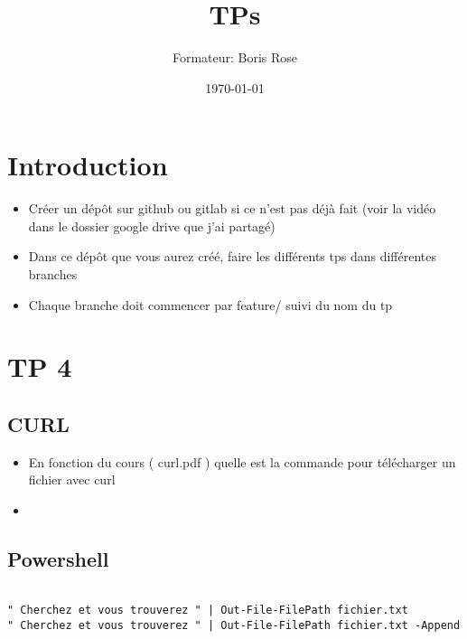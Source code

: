 \documentclass[12pt, letterpaper]{article}
\title{TPs}
\author{Formateur: Boris Rose}
\date{\today}
\begin{document}
\maketitle

\section*{Introduction}

\begin{tcolorbox}[colback=brown!5,colframe=brown!60!black,title=Consignes]

\begin{itemize}
    \item Créer un dépôt sur github ou gitlab si ce n'est pas déjà fait (voir la vidéo dans le dossier google drive que j'ai partagé)
    \item Dans ce dépôt que vous aurez créé, faire les différents tps dans différentes branches
    \item Chaque branche doit commencer par feature/ suivi du nom du tp 
\end{itemize}


\end{tcolorbox}


\section*{TP 4}


\subsection*{CURL}

\begin{itemize}
    \item En fonction du cours ( curl.pdf ) quelle est la commande pour télécharger un fichier avec curl 
    \item 
\end{itemize}


\subsection*{Powershell}

\begin{verbatim}

" Cherchez et vous trouverez " | Out-File-FilePath fichier.txt
" Cherchez et vous trouverez " | Out-File-FilePath fichier.txt -Append
    
\end{verbatim}
\end{document}
